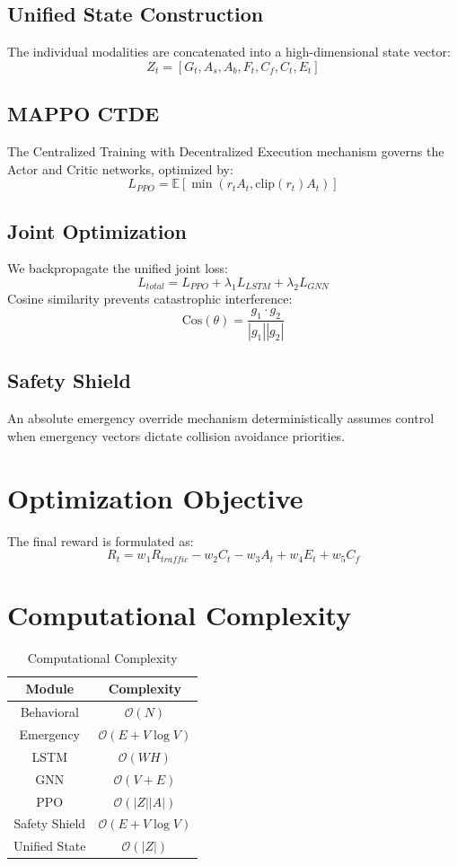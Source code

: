 \documentclass[journal]{IEEEtran}
\begin{document}
\subsection{Unified State Construction}
The individual modalities are concatenated into a high-dimensional state vector:
$$ Z_t = [G_t, A_s, A_b, F_t, C_f, C_t, E_t] $$

\subsection{MAPPO CTDE}
The Centralized Training with Decentralized Execution mechanism governs the Actor and Critic networks, optimized by:
$$ L_{PPO} = \mathbb{E}[\min(r_t A_t, \text{clip}(r_t) A_t)] $$

\subsection{Joint Optimization}
We backpropagate the unified joint loss:
$$ L_{total} = L_{PPO} + \lambda_1 L_{LSTM} + \lambda_2 L_{GNN} $$
Cosine similarity prevents catastrophic interference:
$$ \text{Cos}(\theta) = \frac{g_1 \cdot g_2}{|g_1| |g_2|} $$

\subsection{Safety Shield}
An absolute emergency override mechanism deterministically assumes control when emergency vectors dictate collision avoidance priorities.

\section{Optimization Objective}
\label{sec:optimization_objective}
The final reward is formulated as:
$$ R_t = w_1 R_{traffic} - w_2 C_t - w_3 A_t + w_4 E_t + w_5 C_f $$

\section{Computational Complexity}
\label{sec:complexity}
\begin{table}[htbp]
\centering
\caption{Computational Complexity}
\begin{tabular}{|c|c|}
\hline
\textbf{Module} & \textbf{Complexity} \\
\hline
Behavioral & $\mathcal{O}(N)$ \\
Emergency & $\mathcal{O}(E+V\log V)$ \\
LSTM & $\mathcal{O}(WH)$ \\
GNN & $\mathcal{O}(V+E)$ \\
PPO & $\mathcal{O}(|Z||A|)$ \\
Safety Shield & $\mathcal{O}(E+V\log V)$ \\
Unified State & $\mathcal{O}(|Z|)$ \\
\hline
\end{tabular}
\end{table}
\end{document}
